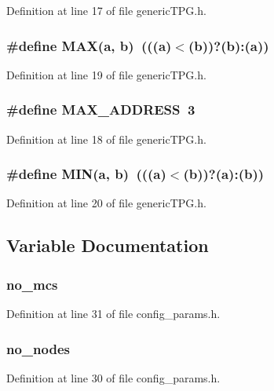 Definition at line 17 of file genericTPG.h.
\subsubsection[{MAX}]{\setlength{\rightskip}{0pt plus 5cm}\#define MAX(a, \/  b)~(((a)$<$(b))?(b):(a))}\label{genericTPG_8h_fa99ec4acc4ecb2dc3c2d05da15d0e3f}




Definition at line 19 of file genericTPG.h.
\subsubsection[{MAX\_\-ADDRESS}]{\setlength{\rightskip}{0pt plus 5cm}\#define MAX\_\-ADDRESS~3}\label{genericTPG_8h_aba07841c3e227bc8bdd8ccdad149349}




Definition at line 18 of file genericTPG.h.
\subsubsection[{MIN}]{\setlength{\rightskip}{0pt plus 5cm}\#define MIN(a, \/  b)~(((a)$<$(b))?(a):(b))}\label{genericTPG_8h_3acffbd305ee72dcd4593c0d8af64a4f}




Definition at line 20 of file genericTPG.h.

\subsection{Variable Documentation}
\subsubsection[{no\_\-mcs}]{ {\bf no\_\-mcs}}\label{genericTPG_8h_56d27d790e05179f3787fce80d802d04}




Definition at line 31 of file config\_\-params.h.
\subsubsection[{no\_\-nodes}]{ {\bf no\_\-nodes}}\label{genericTPG_8h_b78c10782810279fb9680eafef33b77d}




Definition at line 30 of file config\_\-params.h.